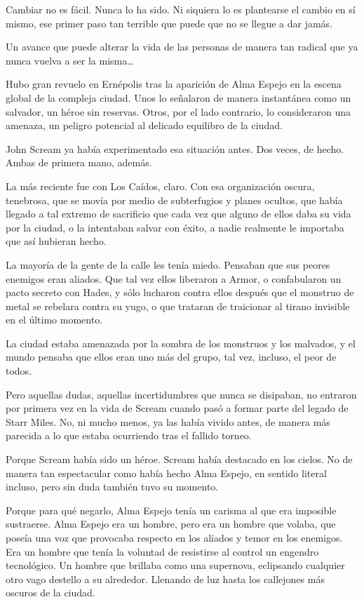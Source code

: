 Cambiar no es fácil. Nunca lo ha sido. Ni siquiera lo es plantearse el cambio en sí mismo, ese primer paso tan terrible que puede que no se llegue a dar jamás.

Un avance que puede alterar la vida de las personas de manera tan radical que ya nunca vuelva a ser la misma\dots

\fancyparbreak
Hubo gran revuelo en Ernépolis tras la aparición de Alma Espejo en la escena global de la compleja ciudad. Unos lo señalaron de manera instantánea como un salvador, un héroe sin reservas. Otros, por el lado contrario, lo consideraron una amenaza, un peligro potencial al delicado equilibro de la ciudad.

John Scream ya había experimentado esa situación antes. Dos veces, de hecho. Ambas de primera mano, además.

La más reciente fue con Los Caídos, claro. Con esa organización oscura, tenebrosa, que se movía por medio de subterfugios y planes ocultos, que había llegado a tal extremo de sacrificio que cada vez que alguno de ellos daba su vida por la ciudad, o la intentaban salvar con éxito, a nadie realmente le importaba que así hubieran hecho.

La mayoría de la gente de la calle les tenía miedo. Pensaban que sus peores enemigos eran aliados. Que tal vez ellos liberaron a Armor, o confabularon un pacto secreto con Hades, y sólo lucharon contra ellos después que el monstruo de metal se rebelara contra su yugo, o que trataran de traicionar al tirano invisible en el último momento.

La ciudad estaba amenazada por la sombra de los monstruos y los malvados, y el mundo pensaba que ellos eran uno más del grupo, tal vez, incluso, el peor de todos.

Pero aquellas dudas, aquellas incertidumbres que nunca se disipaban, no entraron por primera vez en la vida de Scream cuando pasó a formar parte del legado de Starr Miles. No, ni mucho menos, ya las había vivido antes, de manera más parecida a lo que estaba ocurriendo tras el fallido torneo.

Porque Scream había sido un héroe. Scream había destacado en los cielos. No de manera tan espectacular como había hecho Alma Espejo, en sentido literal incluso, pero sin duda también tuvo su momento.

Porque para qué negarlo, Alma Espejo tenía un carisma al que era imposible sustraerse. Alma Espejo era un hombre, pero era un hombre que volaba, que poseía una voz que provocaba respecto en los aliados y temor en los enemigos. Era un hombre que tenía la voluntad de resistirse al control un engendro tecnológico. Un hombre que brillaba como una supernova, eclipsando cualquier otro vago destello a su alrededor. Llenando de luz hasta los callejones más oscuros de la ciudad.

